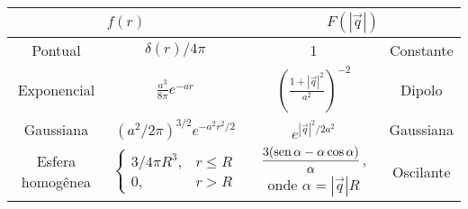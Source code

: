 \begin{tabular}{cc|cc}
	\toprule 
	\multicolumn{2}{c}{$f(r)$} & \multicolumn{2}{c}{$F(|\vec{q}|)$} \\
	\midrule
	Pontual & $\delta (r) / 4 \pi$ & 1 & Constante \\
	Exponencial & $\displaystyle \frac{a^3}{8\pi} e^{-ar}$ &
	$\displaystyle \left(\frac{1 + |\vec{q}|^2}{a^2}\right) ^{-2}$ &
	Dipolo \\
	Gaussiana & $ \left( a^2 / 2\pi \right)^{3/2} e
	^{-a^2 r^2 / 2}$ & $e^{|\vec{q}|^2 / 2a^2 }$ & Gaussiana \\
	Esfera homogênea & $\displaystyle \begin{cases}
		3/4\pi R^3, & r \leq R \\
		0, & r > R
	\end{cases}$ & $ \displaystyle \frac{3(\operatorname*{sen} \alpha - \alpha \cos
	\alpha)}{\alpha}$, onde $\alpha = |\vec{q}| R$ &
	Oscilante \\
	\bottomrule
\end{tabular}

